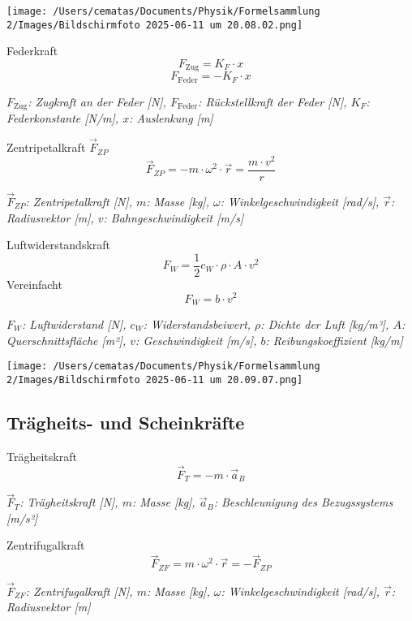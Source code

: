 \documentclass[a4paper,10pt]{article}
\newenvironment{displayformula}
{
	\begin{framed}
		\color{formulaColor}
	}
	{\end{framed}}
\newcommand{\formulalegend}[1]{%
	\par\vspace{0.5ex}%
	{{\color{legendColor}\RaggedRight\small\textit{#1}}}%
	\par\vspace{1.5ex}%
}
\begin{document}
\texttt{[image: /Users/cematas/Documents/Physik/Formelsammlung 2/Images/Bildschirmfoto 2025-06-11 um 20.08.02.png]}

\begin{displayformula}
	Federkraft
	\[
	F_{\text{Zug}} = K_F \cdot x
	\]
	\[
	F_{\text{Feder}} = -K_F \cdot x
	\]
\end{displayformula}
\formulalegend{
	\( F_{\text{Zug}} \): Zugkraft an der Feder [N], \( F_{\text{Feder}} \): Rückstellkraft der Feder [N], \( K_F \): Federkonstante [N/m], \( x \): Auslenkung [m]
}

\begin{displayformula}
	Zentripetalkraft \( \vec{F}_{ZP} \)
	\[
	\vec{F}_{ZP} = -m \cdot \omega^2 \cdot \vec{r} = \frac{m \cdot v^2}{r}
	\]
\end{displayformula}
\formulalegend{
	\( \vec{F}_{ZP} \): Zentripetalkraft [N], \( m \): Masse [kg], \( \omega \): Winkelgeschwindigkeit [rad/s], \( \vec{r} \): Radiusvektor [m], \( v \): Bahngeschwindigkeit [m/s]
}

\begin{displayformula}
	Luftwiderstandskraft
	\[
	F_W = \frac{1}{2} c_W \cdot \rho \cdot A \cdot v^2
	\]
	Vereinfacht
	\[
	F_W = b \cdot v^2
	\]
\end{displayformula}
\formulalegend{
	\( F_W \): Luftwiderstand [N], \( c_W \): Widerstandsbeiwert, \( \rho \): Dichte der Luft [kg/m³], \( A \): Querschnittsfläche [m²], \( v \): Geschwindigkeit [m/s], \( b \): Reibungskoeffizient [kg/m]
}

\texttt{[image: /Users/cematas/Documents/Physik/Formelsammlung 2/Images/Bildschirmfoto 2025-06-11 um 20.09.07.png]}

\subsection{Trägheits- und Scheinkräfte}

\begin{displayformula}
	Trägheitskraft
	\[
	\vec{F}_T = -m \cdot \vec{a}_B
	\]
\end{displayformula}
\formulalegend{
	\( \vec{F}_T \): Trägheitskraft [N], \( m \): Masse [kg], \( \vec{a}_B \): Beschleunigung des Bezugssystems [m/s²]
}

\begin{displayformula}
	Zentrifugalkraft
	\[
	\vec{F}_{ZF} = m \cdot \omega^2 \cdot \vec{r} = - \vec{F}_{ZP}
	\]
\end{displayformula}
\formulalegend{
	\( \vec{F}_{ZF} \): Zentrifugalkraft [N], \( m \): Masse [kg], \( \omega \): Winkelgeschwindigkeit [rad/s], \( \vec{r} \): Radiusvektor [m]
}
\end{document}
